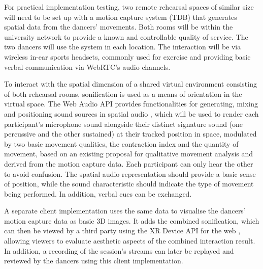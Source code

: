 For practical implementation testing, two remote rehearsal spaces of similar size will need to be set up with a motion capture system (TDB) that generates spatial data from the dancers' movements. Both rooms will be within the university network to provide a known and controllable quality of service. The two dancers will use the system in each location. The interaction will be via wireless in-ear sports headsets, commonly used for exercise and providing basic verbal communication via \ac{WebRTC}'s audio channels.

To interact with the spatial dimension of a shared virtual environment consisting of both rehearsal rooms, sonification is used as a means of orientation in the virtual space. The Web Audio \ac{API} provides functionalities for generating, mixing and positioning sound sources in spatial audio \parencite{webAudioSpec}, which will be used to render each participant's microphone sound alongside their distinct signature sound (one percussive and the other sustained) at their tracked position in space, modulated by two basic movement qualities, the contraction index and the quantity of movement, based on an existing proposal for qualitative movement analysis \parencite{movementQualities} and derived from the motion capture data. Each participant can only hear the other to avoid confusion. The spatial audio representation should provide a basic sense of position, while the sound characteristic should indicate the type of movement being performed. In addition, verbal cues can be exchanged.

A separate client implementation uses the same data to visualise the dancers' motion capture data as basic \ac{3D} images. It adds the combined sonification, which can then be viewed by a third party using the \ac{XR} Device \ac{API} for the web \parencite{webXrSpec}, allowing viewers to evaluate aesthetic aspects of the combined interaction result. In addition, a recording of the session's streams can later be replayed and reviewed by the dancers using this client implementation.
